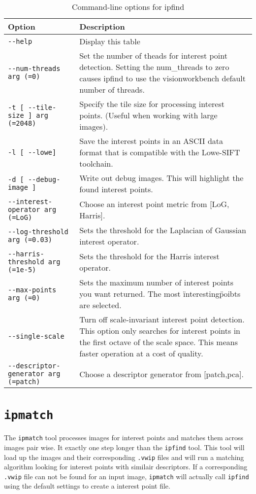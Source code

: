 \begin{longtable}{|l|p{9cm}|}
\caption{Command-line options for ipfind}
\label{tbl:ipfind}
\endfirsthead
\endhead
\endfoot
\endlastfoot
\hline
Option & Description \\ \hline \hline
\verb#--help# & Display this table\\ \hline
\verb#--num-threads arg (=0)# & Set the number of theads for interest point detection. Setting the num\_threads to zero causes ipfind to use the visionworkbench default number of threads.\\ \hline
\verb#-t [ --tile-size ] arg (=2048)# & Specify the tile size for processing interest points. (Useful when working with large images).\\ \hline
\verb#-l [ --lowe]# & Save the interest points in an ASCII data format that is compatible with the Lowe-SIFT toolchain.\\ \hline
\verb#-d [ --debug-image ]# & Write out debug images. This will highlight the found interest points.\\ \hline
\verb#--interest-operator arg (=LoG)# & Choose an interest point metric from [LoG, Harris].\\ \hline
\verb#--log-threshold arg (=0.03)# & Sets the threshold for the Laplacian of Gaussian interest operator.\\ \hline
\verb#--harris-threshold arg (=1e-5)# & Sets the threshold for the Harris interest operator.\\ \hline
\verb#--max-points arg (=0)# & Sets the maximum number of interest points you want returned. The most \"interesting\" poibts are selected.\\ \hline
\verb#--single-scale# & Turn off scale-invariant interest point detection. This option only searches for interest points in the first octave of the scale space. This means faster operation at a cost of quality.\\ \hline
\verb#--descriptor-generator arg (=patch)# & Choose a descriptor generator from [patch,pca].\\ \hline
\end{longtable}


\section{{\tt ipmatch}}\label{sec:ipmatch}
The \verb#ipmatch# tool processes images for interest points and matches them across images pair wise. It exactly one step longer than the \verb#ipfind# tool. This tool will load up the images and their corresponding \verb#.vwip# files and will run a matching algorithm looking for interest points with similair descriptors. If a corresponding \verb#.vwip# file can not be found for an input image, \verb#ipmatch# will actually call \verb#ipfind# using the default settings to create a interest point file.

